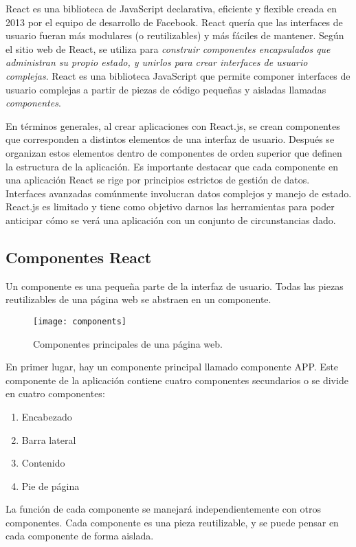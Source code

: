 React es una biblioteca de JavaScript declarativa, eficiente y flexible creada en 2013 por el equipo de desarrollo de Facebook. React quería que las interfaces de usuario fueran más modulares (o reutilizables) y más fáciles de mantener. Según el sitio web de React, se utiliza para \textit{construir componentes encapsulados que administran su propio estado, y unirlos para crear interfaces de usuario complejas}. React es una biblioteca JavaScript que permite componer interfaces de usuario complejas a partir de piezas de código pequeñas y aisladas llamadas \textit{componentes}.
\vspace{0.8cm}

En términos generales, al crear aplicaciones con React.js, se crean componentes que corresponden a distintos elementos de una interfaz de usuario. Después se organizan estos elementos dentro de componentes de orden superior que definen la estructura de la aplicación. Es importante destacar que cada componente en una aplicación React se rige por principios estrictos de gestión de datos. Interfaces avanzadas comúnmente involucran datos complejos y manejo de estado. React.js es limitado y tiene como objetivo darnos las herramientas para poder anticipar cómo se verá una aplicación con un conjunto de circunstancias dado.
\subsection{Componentes React}
Un componente es una pequeña parte de la interfaz de usuario. Todas las piezas reutilizables de una página web se abstraen en un componente.
\begin{figure}[H]
  \centering
  \texttt{[image: components]}
  \caption{Componentes principales de una página web.}
\end{figure}
En primer lugar, hay un componente principal llamado componente APP. Este componente de la aplicación contiene cuatro componentes secundarios o se divide en cuatro componentes:
\begin{enumerate}
  \item Encabezado
  \item Barra lateral
  \item Contenido
  \item Pie de página
\end{enumerate}
La función de cada componente se manejará independientemente con otros componentes. Cada componente es una pieza reutilizable, y se puede pensar en cada componente de forma aislada.
\vspace{0.8cm}

